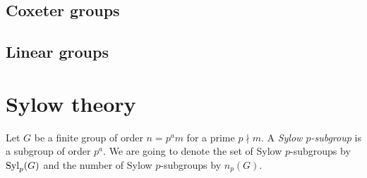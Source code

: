 \documentclass{../exp}
\begin{document}
\subsection{Coxeter groups}
\subsection{Linear groups}


\section{Sylow theory}
\begin{defn}
Let $G$ be a finite group of order $n=p^am$ for a prime $p\nmid m$.
A \emph{Sylow $p$-subgroup} is a subgroup of order $p^a$.
We are going to denote the set of Sylow $p$-subgroups by $\operatorname{Syl}_p(G)$ and the number of Sylow $p$-subgroups by $n_p(G)$.
\end{defn}
\end{document}
